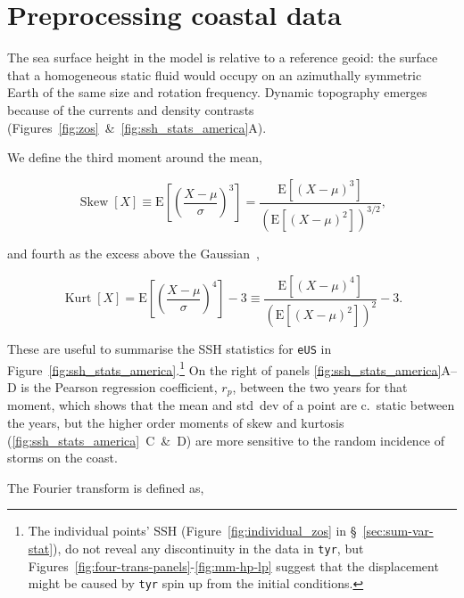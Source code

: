 \section{Preprocessing coastal data}
The sea surface height in the model is relative to
a reference geoid: the surface that a homogeneous static fluid would occupy
on an azimuthally symmetric Earth of the same size and rotation frequency.
Dynamic topography emerges because of the
currents and density contrasts (Figures~\ref{fig:zos}~\&~\ref{fig:ssh_stats_america}A).




We define the third  moment around the mean,

\begin{equation}
\operatorname{Skew}[X]\equiv \mathrm{E}\left[\left(\frac{X-\mu}{\sigma}\right)^{3}\right]
=\frac{\mathrm{E}\left[(X-\mu)^{3}\right]}{\left(\mathrm{E}\left[(X-\mu)^{2}\right]\right)^{3 / 2}},
\end{equation}

and fourth as the excess above the Gaussian~\cite{taleb2019statistical},

\begin{equation}
\operatorname{Kurt}[X]=
\mathrm{E}\left[\left(\frac{X-\mu}{\sigma}\right)^{4}\right]-3
\equiv \frac{\mathrm{E}\left[(X-\mu)^{4}\right]}{\left(\mathrm{E}\left[(X-\mu)^{2}\right]\right)^{2}}-3.
\end{equation}






These are useful to summarise the SSH statistics
for \texttt{eUS} in Figure~\ref{fig:ssh_stats_america}.\footnote{
The individual points' SSH (Figure~\ref{fig:individual_zos} in §~\ref{sec:sum-var-stat}),
do not reveal any discontinuity in the data in \texttt{tyr},
 but Figures~\ref{fig:four-trans-panels}-\ref{fig:mm-hp-lp}
suggest that the displacement might be caused by \texttt{tyr} spin up from the
initial conditions.
}
On the right of panels \ref{fig:ssh_stats_america}A--D
is the Pearson regression coefficient, $r_p$,
between the two years for that moment, which shows that the mean and
std~dev of a point are c.~static between the years,
but the higher order moments of skew and kurtosis
(\ref{fig:ssh_stats_america}~C~\&~D) are more sensitive to the
random incidence of storms on the coast.


\label{sec:fourier}

The Fourier transform is defined as,

